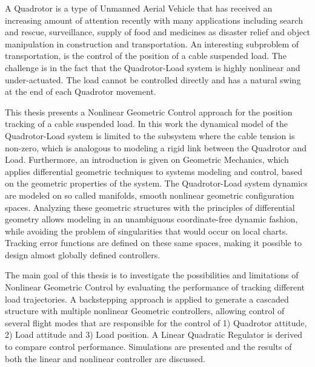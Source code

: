 
A Quadrotor is a type of Unmanned Aerial Vehicle that has received an increasing amount of attention recently with many applications including search and rescue, surveillance, supply of food and medicines as disaster relief and object manipulation in construction and transportation.
An interesting subproblem of transportation, is the control of the position of a cable suspended load. The challenge is in the fact that the Quadrotor-Load system is highly nonlinear and under-actuated. The load cannot be controlled directly and has a natural swing at the end of each Quadrotor movement. 

This thesis presents a Nonlinear Geometric Control approach for the position tracking of a cable suspended load. In this work the dynamical model of the Quadrotor-Load system is limited to the subsystem where the cable tension is non-zero, which is analogous to modeling a rigid link between the Quadrotor and Load.
Furthermore, an introduction is given on Geometric Mechanics, which applies differential geometric techniques to systems modeling and control, based on the geometric properties of the system. The Quadrotor-Load system dynamics are modeled on so called manifolds, smooth nonlinear geometric configuration spaces. 
Analyzing these geometric structures with the principles of differential geometry allows modeling in an unambiguous coordinate-free dynamic fashion, while avoiding the problem of singularities that would occur on local charts. Tracking error functions are defined on these same spaces, making it possible to design almost globally defined controllers.

The main goal of this thesis is to investigate the possibilities and limitations of Nonlinear Geometric Control by evaluating the performance of tracking different load trajectories. 
A backstepping approach is applied to generate a cascaded structure with multiple nonlinear Geometric controllers, allowing control of several flight modes that are responsible for the control of 1) Quadrotor attitude, 2) Load attitude and 3) Load position. 
A Linear Quadratic Regulator is derived to compare control performance. Simulations are presented and the results of both the linear and nonlinear controller are discussed. 

%
%
%

